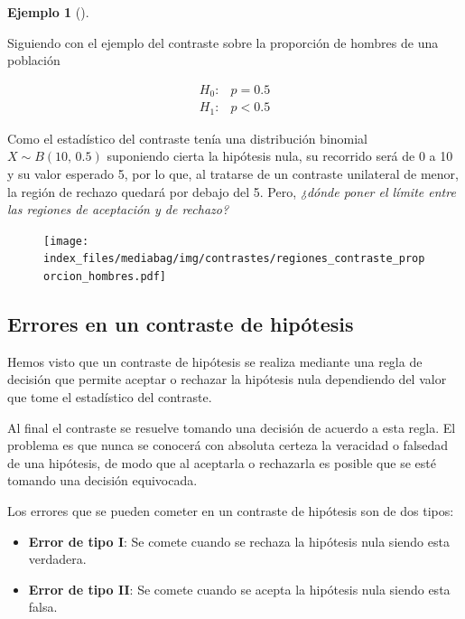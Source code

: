 \documentclass[
  a4paper,
]{scrreport}
\theoremstyle{definition}
\theoremstyle{definition}
\newtheorem{example}{Ejemplo}[chapter]
\theoremstyle{plain}
\theoremstyle{remark}
\begin{document}
\begin{example}[]\protect\hypertarget{exm-regiones-aceptacion-rechazo}{}\label{exm-regiones-aceptacion-rechazo}

Siguiendo con el ejemplo del contraste sobre la proporción de hombres de
una población

\begin{align*}
H_0: & p=0.5 \\
H_1: & p<0.5
\end{align*}

Como el estadístico del contraste tenía una distribución binomial
\(X\sim B(10,\,0.5)\) suponiendo cierta la hipótesis nula, su recorrido
será de 0 a 10 y su valor esperado 5, por lo que, al tratarse de un
contraste unilateral de menor, la región de rechazo quedará por debajo
del 5. Pero, \emph{¿dónde poner el límite entre las regiones de
aceptación y de rechazo?}

\begin{figure}

{\centering \texttt{[image: index\_files/mediabag/img/contrastes/regiones\_contraste\_proporcion\_hombres.pdf]}

}

\end{figure}

\end{example}

\hypertarget{errores-en-un-contraste-de-hipuxf3tesis}{%
\subsection{Errores en un contraste de
hipótesis}\label{errores-en-un-contraste-de-hipuxf3tesis}}

Hemos visto que un contraste de hipótesis se realiza mediante una regla
de decisión que permite aceptar o rechazar la hipótesis nula dependiendo
del valor que tome el estadístico del contraste.

Al final el contraste se resuelve tomando una decisión de acuerdo a esta
regla. El problema es que nunca se conocerá con absoluta certeza la
veracidad o falsedad de una hipótesis, de modo que al aceptarla o
rechazarla es posible que se esté tomando una decisión equivocada.

Los errores que se pueden cometer en un contraste de hipótesis son de
dos tipos:

\begin{itemize}
\item
  \textbf{Error de tipo I}: Se comete cuando se rechaza la hipótesis
  nula siendo esta verdadera.
\item
  \textbf{Error de tipo II}: Se comete cuando se acepta la hipótesis
  nula siendo esta falsa.
\end{itemize}
\end{document}
